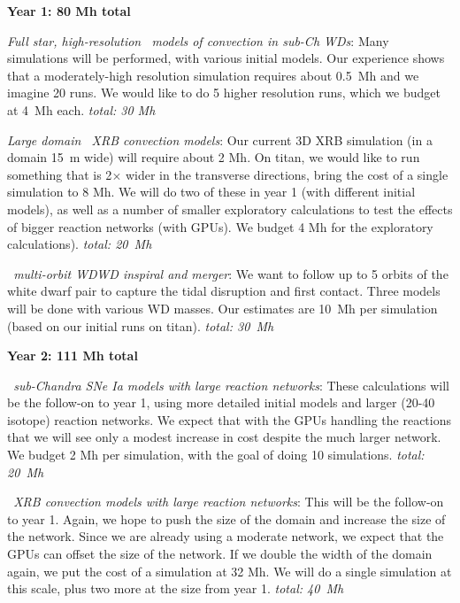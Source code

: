 \documentclass[11pt,letterpaper,english]{article}
\begin{document}
\begin{tightitem}
\item {\bf Year 1: 80 Mh total }
%
\begin{tightitem}
\item {\em Full star, high-resolution \maestro\ models of convection
  in sub-Ch WDs}: Many simulations will be performed, with
  various initial models.  Our experience shows that a moderately-high
  resolution simulation requires about 0.5~Mh and we imagine 20 runs.
  We would like to do 5 higher resolution runs, which we budget at 4~Mh
  each.  {\em total: 30 Mh}

\item {\em Large domain \maestro\ XRB convection models}: Our current
  3D XRB simulation (in a domain 15~m wide) will require about 2 Mh.
  On titan, we would like to run something that is 2$\times$ wider in
  the transverse directions, bring the cost of a single simulation to
  8 Mh.  We will do two of these in year 1 (with different initial
  models), as well as a number of smaller exploratory calculations to
  test the effects of bigger reaction networks (with GPUs).  We budget 
  4 Mh for the exploratory
  calculations).  {\em total: 20~Mh}

\item {\em \castro\ multi-orbit WDWD inspiral and merger}: We want
  to follow up to 5 orbits of the white dwarf pair to capture the
  tidal disruption and first contact.  Three models will be done
  with various WD masses.  Our estimates are 10~Mh per simulation
  (based on our initial runs on titan).  {\em total: 30~Mh}
\end{tightitem}
%  
\item {\bf Year 2: 111 Mh total}
%
\begin{tightitem}
\item {\em \maestro\ sub-Chandra SNe Ia models with large reaction
  networks}: These calculations will be the follow-on to year 1, using
  more detailed initial models and larger (20-40 isotope) reaction
  networks.  We expect that with the GPUs handling the reactions that
  we will see only a modest increase in cost despite the much larger
  network.  We budget 2 Mh per simulation, with the goal of doing 10
  simulations.  {\em total: 20~Mh}

\item {\em \maestro\ XRB convection models with large reaction networks}:
  This will be the follow-on to year 1.  Again, we hope to push the
  size of the domain and increase the size of the network.  Since we 
  are already using a moderate network, we expect that the GPUs
  can offset the size of the network.  If we double the width of
  the domain again, we put the cost of a simulation at 32 Mh.  We 
  will do a single simulation at this scale, plus two more
  at the size from year 1. {\em total: 40~Mh}


\end{tightitem}
\end{tightitem}
\end{document}
